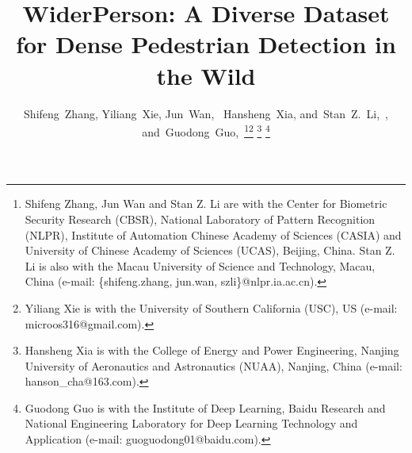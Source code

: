 \documentclass[journal]{IEEEtran}
\begin{document}
\title{WiderPerson: A Diverse Dataset for Dense Pedestrian Detection in the Wild}

\author{Shifeng~Zhang,
        Yiliang~Xie,
        Jun~Wan,~
        Hansheng~Xia,
        and~Stan~Z.~Li,~,
        and~Guodong~Guo,~\thanks{Shifeng Zhang, Jun Wan and Stan Z. Li are with the Center for Biometric Security Research (CBSR), National Laboratory of Pattern Recognition (NLPR), Institute of Automation Chinese Academy of Sciences (CASIA) and University of Chinese Academy of Sciences (UCAS), Beijing, China. Stan Z. Li is also with the Macau University of Science and Technology, Macau, China (e-mail: \{shifeng.zhang, jun.wan, szli\}@nlpr.ia.ac.cn).}\thanks{Yiliang Xie is with the University of Southern California (USC), US (e-mail: microos316@gmail.com).}
\thanks{Hansheng Xia is with the College of Energy and Power Engineering, Nanjing University of Aeronautics and Astronautics (NUAA), Nanjing, China (e-mail: hanson\_cha@163.com).}
\thanks{Guodong Guo is with the Institute of Deep Learning, Baidu Research and National Engineering Laboratory for Deep Learning Technology and Application (e-mail: guoguodong01@baidu.com).}
}


\maketitle
\end{document}
